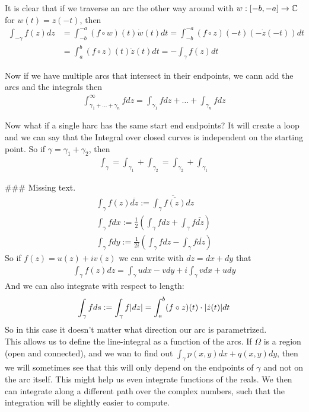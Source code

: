 It is clear that if we traverse an arc the other way around with $w: [-b,-a] \to \mathbb{C}$ for $w(t) = z(-t)$, then 
\begin{align*}
	\int_{-\gamma} f(z) dz &= \int_{-b}^{-a}(f \circ w)(t) \dot{w}(t) dt = \int_{-b}^{-a} (f \circ z)(-t) (-\dot{z}(-t)) dt\\
												 &= \int_{a}^{b} (f \circ z)(t) \dot{z}(t) dt = - \int_{\gamma}f(z) dt
\end{align*}

Now if we have multiple arcs that intersect in their endpoints, we cann add the arcs and the integrals then
\begin{align*}
	\int_{\gamma_1 + \ldots + \gamma_n}^{\infty} f dz = \int_{\gamma_1}f dz + \ldots + \int_{\gamma_n}f dz
\end{align*}

Now what if a single harc has the same start end endpoints? It will create a loop and we can say that the Integral over closed curves is independent on the starting point. So if
$\gamma = \gamma_1 + \gamma_2$, then
\begin{align*}
	\int_{\gamma} = \int_{\gamma_1} + \int_{\gamma_2} = \int_{\gamma_2} + \int_{\gamma_1}
\end{align*}

\#\#\# Missing text.
\begin{align*}
\int_{\gamma} f(z) \overline{dz} := \overline{\int_{\gamma} \overline{f(z)} dz}\\
	\int_{\gamma}f dx := \frac{1}{2} \left(\int_{\gamma} f dz + \int_{\gamma} f \overline{dz}\right)\\
	\int_{\gamma}f dy := \frac{1}{2i} \left(\int_{\gamma} f dz - \int_{\gamma} f \overline{dz}\right)
\end{align*}
So if $f(z) = u(z) + iv(z)$ we can write with $dz = dx + dy$ that
\begin{align*}
	\int_{\gamma} f(z) dz = \int_{\gamma} u dx - v dy + i \int_{\gamma} v dx + u dy
\end{align*}
And we can also integrate with respect to length:
\begin{align*}
	\int_{\gamma} f ds := \int_{\gamma}f \vert dz\vert = \int_{a}^{b} (f \circ z)(t) \cdot \vert\dot{z}(t)\vert dt
\end{align*}
So in this case it doesn't matter what direction our arc is parametrized.\\


This allows us to define the line-integral as a function of the arcs. If $\Omega$ is a region (open and connected), and we wan to find out  $\int_{\gamma} p(x,y) dx + q(x,y) dy$, then we will sometimes see that this will only depend on the endpoints of $\gamma$ and not on the arc itself.
This might help us even integrate functions of the reals. We then can integrate along a different path over the complex numbers, such that the integration will be slightly easier to compute.\\



